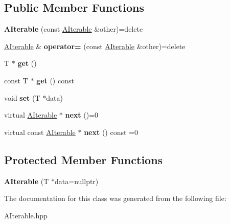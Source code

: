 \subsection*{Public Member Functions}
\begin{DoxyCompactItemize}
\item 
\mbox{\label{classwood_box_1_1utility_1_1_a_iterable_aa8f6eb12adefa838343af8d8854ac7f6}} 
{\bfseries A\+Iterable} (const \mbox{\hyperlink{classwood_box_1_1utility_1_1_a_iterable}{A\+Iterable}} \&other)=delete
\item 
\mbox{\label{classwood_box_1_1utility_1_1_a_iterable_a9dfe1e1906628ef0892b50d12ba8696a}} 
\mbox{\hyperlink{classwood_box_1_1utility_1_1_a_iterable}{A\+Iterable}} \& {\bfseries operator=} (const \mbox{\hyperlink{classwood_box_1_1utility_1_1_a_iterable}{A\+Iterable}} \&other)=delete
\item 
\mbox{\label{classwood_box_1_1utility_1_1_a_iterable_a1ae4da148f184a6e95649c2e967389aa}} 
T $\ast$ {\bfseries get} ()
\item 
\mbox{\label{classwood_box_1_1utility_1_1_a_iterable_a675dfb37558f14704afeb50ab544f99f}} 
const T $\ast$ {\bfseries get} () const
\item 
\mbox{\label{classwood_box_1_1utility_1_1_a_iterable_ae8978938416061fcfa2180ba2cd7f48c}} 
void {\bfseries set} (T $\ast$data)
\item 
\mbox{\label{classwood_box_1_1utility_1_1_a_iterable_a3ddc252101ff34784456f0a3d712f4df}} 
virtual \mbox{\hyperlink{classwood_box_1_1utility_1_1_a_iterable}{A\+Iterable}} $\ast$ {\bfseries next} ()=0
\item 
\mbox{\label{classwood_box_1_1utility_1_1_a_iterable_a7d3afa98e4226f54e5b9671adec5d0ae}} 
virtual const \mbox{\hyperlink{classwood_box_1_1utility_1_1_a_iterable}{A\+Iterable}} $\ast$ {\bfseries next} () const =0
\end{DoxyCompactItemize}
\subsection*{Protected Member Functions}
\begin{DoxyCompactItemize}
\item 
\mbox{\label{classwood_box_1_1utility_1_1_a_iterable_a9db8d4d69d94a3e0f230a6f9e8118c20}} 
{\bfseries A\+Iterable} (T $\ast$data=nullptr)
\end{DoxyCompactItemize}


The documentation for this class was generated from the following file\+:\begin{DoxyCompactItemize}
\item 
A\+Iterable.\+hpp\end{DoxyCompactItemize}
